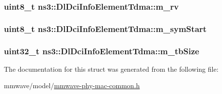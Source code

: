 \subsubsection[{\texorpdfstring{m\+\_\+rv}{m_rv}}]{\setlength{\rightskip}{0pt plus 5cm}uint8\+\_\+t ns3\+::\+Dl\+Dci\+Info\+Element\+Tdma\+::m\+\_\+rv}\hypertarget{structns3_1_1DlDciInfoElementTdma_a32b2f33e9c7852b48215ca00a4d71021}{}\label{structns3_1_1DlDciInfoElementTdma_a32b2f33e9c7852b48215ca00a4d71021}
\subsubsection[{\texorpdfstring{m\+\_\+sym\+Start}{m_symStart}}]{\setlength{\rightskip}{0pt plus 5cm}uint8\+\_\+t ns3\+::\+Dl\+Dci\+Info\+Element\+Tdma\+::m\+\_\+sym\+Start}\hypertarget{structns3_1_1DlDciInfoElementTdma_a86d3cacb313ce812a68834293941540e}{}\label{structns3_1_1DlDciInfoElementTdma_a86d3cacb313ce812a68834293941540e}
\subsubsection[{\texorpdfstring{m\+\_\+tb\+Size}{m_tbSize}}]{\setlength{\rightskip}{0pt plus 5cm}uint32\+\_\+t ns3\+::\+Dl\+Dci\+Info\+Element\+Tdma\+::m\+\_\+tb\+Size}\hypertarget{structns3_1_1DlDciInfoElementTdma_a74b7e4b7737d4b10d2a23720fb59dae3}{}\label{structns3_1_1DlDciInfoElementTdma_a74b7e4b7737d4b10d2a23720fb59dae3}


The documentation for this struct was generated from the following file\+:\begin{DoxyCompactItemize}
\item 
mmwave/model/\hyperlink{mmwave-phy-mac-common_8h}{mmwave-\/phy-\/mac-\/common.\+h}\end{DoxyCompactItemize}
